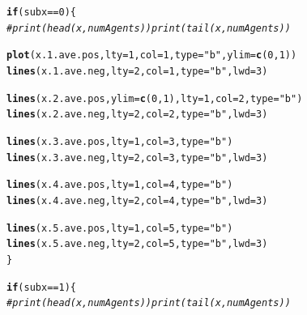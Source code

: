 \documentclass{article}\usepackage[]{graphicx}\usepackage[]{color}
\makeatletter
\newcommand{\hlnum}[1]{\textcolor[rgb]{0.686,0.059,0.569}{#1}}%
\newcommand{\hlstr}[1]{\textcolor[rgb]{0.192,0.494,0.8}{#1}}%
\newcommand{\hlcom}[1]{\textcolor[rgb]{0.678,0.584,0.686}{\textit{#1}}}%
\newcommand{\hlopt}[1]{\textcolor[rgb]{0,0,0}{#1}}%
\newcommand{\hlstd}[1]{\textcolor[rgb]{0.345,0.345,0.345}{#1}}%
\newcommand{\hlkwa}[1]{\textcolor[rgb]{0.161,0.373,0.58}{\textbf{#1}}}%
\newcommand{\hlkwc}[1]{\textcolor[rgb]{0.333,0.667,0.333}{#1}}%
\newcommand{\hlkwd}[1]{\textcolor[rgb]{0.737,0.353,0.396}{\textbf{#1}}}%
\newenvironment{kframe}{%
 \def\at@end@of@kframe{}%
 \ifinner\ifhmode%
  \def\at@end@of@kframe{\end{minipage}}%
  \begin{minipage}{\columnwidth}%
 \fi\fi%
 \def\FrameCommand##1{\hskip\@totalleftmargin \hskip-\fboxsep
 \colorbox{shadecolor}{##1}\hskip-\fboxsep
     \hskip-\linewidth \hskip-\@totalleftmargin \hskip\columnwidth}%
 \MakeFramed {\advance\hsize-\width
   \@totalleftmargin\z@ \linewidth\hsize
   \@setminipage}}%
 {\par\unskip\endMakeFramed%
 \at@end@of@kframe}
\newenvironment{knitrout}{}{} %
\makeatother
\begin{document}
\begin{knitrout}
\begin{kframe}
\begin{alltt}
    \hlkwa{if} \hlstd{(subx} \hlopt{==} \hlnum{0}\hlstd{) \{}
        \hlcom{# print(head(x, numAgents)) print(tail(x, numAgents))}

        \hlkwd{plot}\hlstd{(x.1.ave.pos,} \hlkwc{lty} \hlstd{=} \hlnum{1}\hlstd{,} \hlkwc{col} \hlstd{=} \hlnum{1}\hlstd{,} \hlkwc{type} \hlstd{=} \hlstr{"b"}\hlstd{,} \hlkwc{ylim} \hlstd{=} \hlkwd{c}\hlstd{(}\hlnum{0}\hlstd{,} \hlnum{1}\hlstd{))}
        \hlkwd{lines}\hlstd{(x.1.ave.neg,} \hlkwc{lty} \hlstd{=} \hlnum{2}\hlstd{,} \hlkwc{col} \hlstd{=} \hlnum{1}\hlstd{,} \hlkwc{type} \hlstd{=} \hlstr{"b"}\hlstd{,} \hlkwc{lwd} \hlstd{=} \hlnum{3}\hlstd{)}

        \hlkwd{lines}\hlstd{(x.2.ave.pos,} \hlkwc{ylim} \hlstd{=} \hlkwd{c}\hlstd{(}\hlnum{0}\hlstd{,} \hlnum{1}\hlstd{),} \hlkwc{lty} \hlstd{=} \hlnum{1}\hlstd{,} \hlkwc{col} \hlstd{=} \hlnum{2}\hlstd{,} \hlkwc{type} \hlstd{=} \hlstr{"b"}\hlstd{)}
        \hlkwd{lines}\hlstd{(x.2.ave.neg,} \hlkwc{lty} \hlstd{=} \hlnum{2}\hlstd{,} \hlkwc{col} \hlstd{=} \hlnum{2}\hlstd{,} \hlkwc{type} \hlstd{=} \hlstr{"b"}\hlstd{,} \hlkwc{lwd} \hlstd{=} \hlnum{3}\hlstd{)}

        \hlkwd{lines}\hlstd{(x.3.ave.pos,} \hlkwc{lty} \hlstd{=} \hlnum{1}\hlstd{,} \hlkwc{col} \hlstd{=} \hlnum{3}\hlstd{,} \hlkwc{type} \hlstd{=} \hlstr{"b"}\hlstd{)}
        \hlkwd{lines}\hlstd{(x.3.ave.neg,} \hlkwc{lty} \hlstd{=} \hlnum{2}\hlstd{,} \hlkwc{col} \hlstd{=} \hlnum{3}\hlstd{,} \hlkwc{type} \hlstd{=} \hlstr{"b"}\hlstd{,} \hlkwc{lwd} \hlstd{=} \hlnum{3}\hlstd{)}

        \hlkwd{lines}\hlstd{(x.4.ave.pos,} \hlkwc{lty} \hlstd{=} \hlnum{1}\hlstd{,} \hlkwc{col} \hlstd{=} \hlnum{4}\hlstd{,} \hlkwc{type} \hlstd{=} \hlstr{"b"}\hlstd{)}
        \hlkwd{lines}\hlstd{(x.4.ave.neg,} \hlkwc{lty} \hlstd{=} \hlnum{2}\hlstd{,} \hlkwc{col} \hlstd{=} \hlnum{4}\hlstd{,} \hlkwc{type} \hlstd{=} \hlstr{"b"}\hlstd{,} \hlkwc{lwd} \hlstd{=} \hlnum{3}\hlstd{)}

        \hlkwd{lines}\hlstd{(x.5.ave.pos,} \hlkwc{lty} \hlstd{=} \hlnum{1}\hlstd{,} \hlkwc{col} \hlstd{=} \hlnum{5}\hlstd{,} \hlkwc{type} \hlstd{=} \hlstr{"b"}\hlstd{)}
        \hlkwd{lines}\hlstd{(x.5.ave.neg,} \hlkwc{lty} \hlstd{=} \hlnum{2}\hlstd{,} \hlkwc{col} \hlstd{=} \hlnum{5}\hlstd{,} \hlkwc{type} \hlstd{=} \hlstr{"b"}\hlstd{,} \hlkwc{lwd} \hlstd{=} \hlnum{3}\hlstd{)}
    \hlstd{\}}

    \hlkwa{if} \hlstd{(subx} \hlopt{==} \hlnum{1}\hlstd{) \{}
        \hlcom{# print(head(x, numAgents)) print(tail(x, numAgents))}


\end{alltt}
\end{kframe}
\end{knitrout}
\end{document}
